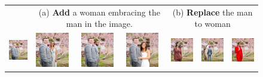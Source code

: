\documentclass{article}
\begin{document}
\begin{figure}[h!]
\begin{center}
\begin{tabular}{@{\hskip 1pt} p{\dimexpr\textwidth/9\relax}
                   @{\hskip 5pt} p{\dimexpr\textwidth/9\relax}
                   @{\hskip 1pt} p{\dimexpr\textwidth/9\relax}
                   @{\hskip 1pt} p{\dimexpr\textwidth/9\relax}
                   @{\hskip 5pt} p{\dimexpr\textwidth/9\relax}
                   @{\hskip 1pt} p{\dimexpr\textwidth/9\relax}
                   @{\hskip 1pt} p{\dimexpr\textwidth/9\relax} @{}}

 & \multicolumn{3}{c}{\tiny (a) \textbf{Add} a woman embracing the man in the image.} & 
\multicolumn{3}{c}{\tiny (b) \textbf{Replace} the man to woman}  \\
\includegraphics[width=\linewidth,  height=1.5cm]{figures/f2/1_1.png} &
\includegraphics[width=\linewidth,  height=1.5cm]{figures/f2/1_2.png} &
\includegraphics[width=\linewidth,  height=1.5cm]{figures/f2/1_3.jpg} &
\includegraphics[width=\linewidth,  height=1.5cm]{figures/f2/1_4.jpg} &
\includegraphics[width=\linewidth,  height=1.5cm]{figures/f2/1_5.jpg} &
\includegraphics[width=\linewidth,  height=1.5cm]{figures/f2/1_6.png} &
\includegraphics[width=\linewidth,  height=1.5cm]{figures/f2/1_7.jpg} \\[-1pt]


\end{tabular}
\end{center}
\end{figure}
\end{document}
